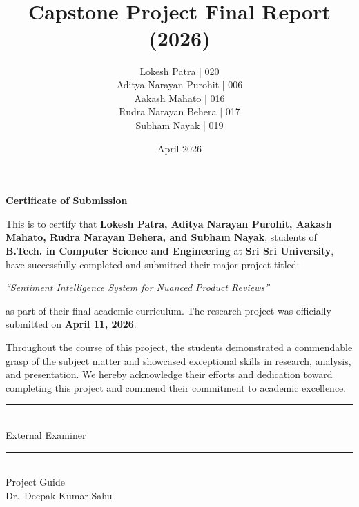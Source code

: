 \documentclass[11pt,oneside]{scrbook}
\title{
    \vspace{0.3cm}
    \Huge \textbf{\projecttitle}\\
    \Large \textit{\mysubtitle}\\
    \vspace{0.3cm}
    \Large Capstone Project Final Report (2026)
}
\author{
    Lokesh Patra | 020 \\
    Aditya Narayan Purohit | 006 \\
    Aakash Mahato | 016 \\
    Rudra Narayan Behera | 017 \\
    Subham Nayak | 019
}
\date{April 2026}
\begin{document}
\sloppy

\frontmatter
\pagestyle{plain}   %
\maketitle

\clearpage
\thispagestyle{empty}

\begin{center}
    {\Large \textbf{Certificate of Submission}}
\end{center}

\vspace{1.5cm}

\noindent
This is to certify that \textbf{Lokesh Patra, Aditya Narayan Purohit, Aakash Mahato, Rudra Narayan Behera, and Subham Nayak}, students of \textbf{B.Tech. in Computer Science and Engineering} at \textbf{Sri Sri University}, have successfully completed and submitted their major project titled:

\vspace{0.5cm}

\begin{center}
    \textit{``Sentiment Intelligence System for Nuanced Product Reviews''}
\end{center}

\vspace{0.5cm}

\noindent
as part of their final academic curriculum. The research project was officially submitted on \textbf{April 11, 2026}.

\vspace{0.5cm}

\noindent
Throughout the course of this project, the students demonstrated a commendable grasp of the subject matter and showcased exceptional skills in research, analysis, and presentation. We hereby acknowledge their efforts and dedication toward completing this project and commend their commitment to academic excellence.

\vspace{2.5cm}

\noindent
\begin{minipage}{0.45\textwidth}
    \centering
    \rule{5cm}{0.4pt} \\
    External Examiner
\end{minipage}
\hfill
\begin{minipage}{0.45\textwidth}
    \centering
    \rule{5cm}{0.4pt} \\
    Project Guide \\
    Dr.\ Deepak Kumar Sahu
\end{minipage}
\end{document}
